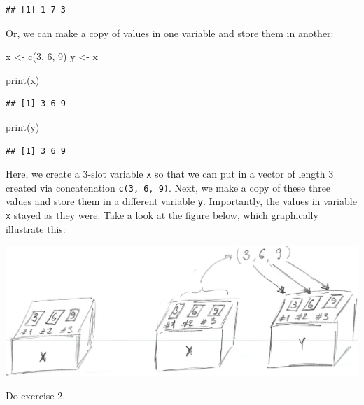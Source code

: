 \documentclass[
]{book}
\newenvironment{Shaded}{\begin{snugshade}}{\end{snugshade}}
\newcommand{\DecValTok}[1]{\textcolor[rgb]{0.00,0.00,0.81}{#1}}
\newcommand{\FunctionTok}[1]{\textcolor[rgb]{0.00,0.00,0.00}{#1}}
\newcommand{\NormalTok}[1]{#1}
\newcommand{\OtherTok}[1]{\textcolor[rgb]{0.56,0.35,0.01}{#1}}
\begin{document}
\begin{verbatim}
## [1] 1 7 3
\end{verbatim}

Or, we can make a copy of values in one variable and store them in another:

\begin{Shaded}
\begin{Highlighting}[]
\NormalTok{x }\OtherTok{\textless{}{-}} \FunctionTok{c}\NormalTok{(}\DecValTok{3}\NormalTok{, }\DecValTok{6}\NormalTok{, }\DecValTok{9}\NormalTok{)}
\NormalTok{y }\OtherTok{\textless{}{-}}\NormalTok{ x }

\FunctionTok{print}\NormalTok{(x)}
\end{Highlighting}
\end{Shaded}

\begin{verbatim}
## [1] 3 6 9
\end{verbatim}

\begin{Shaded}
\begin{Highlighting}[]
\FunctionTok{print}\NormalTok{(y)}
\end{Highlighting}
\end{Shaded}

\begin{verbatim}
## [1] 3 6 9
\end{verbatim}

Here, we create a 3-slot variable \texttt{x} so that we can put in a vector of length 3 created via concatenation \texttt{c(3,\ 6,\ 9)}. Next, we make a copy of these three values and store them in a different variable \texttt{y}. Importantly, the values in variable \texttt{x} stayed as they were. Take a look at the figure below, which graphically illustrate this:

\begin{center}\includegraphics[width=1\linewidth]{images/copy-vector} \end{center}

Do exercise 2.
\end{document}
